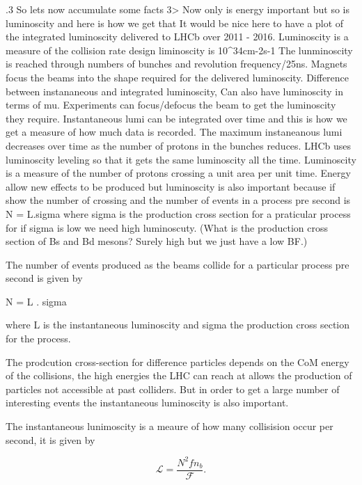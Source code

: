 .3
So lets now accumulate some facts 
3> Now only is energy important but so is luminoscity and here is how we get that
It would be nice here to have a plot of the integrated luminoscity delivered to LHCb over 2011 - 2016.
Luminoscity is a measure of the collision rate
design liminoscity is 10^34cm-2s-1
The lunminoscity is reached through numbers of bunches and revolution frequency/25ns.
Magnets focus the beams into the shape required for the delivered luminoscity.
Difference between instananeous and integrated luminoscity,
Can also have luminoscity in terms of mu.
Experiments can focus/defocus the beam to get the luminoscity they require.
Instantaneous lumi can be integrated over time and this is how we get a measure of how much data is recorded.
The maximum instaneanous lumi decreases over time as the number of protons in the bunches reduces. LHCb uses luminoscity leveling so that it gets the same luminoscity all the time.
Luminoscity is a measure of the number of protons crossing a unit area per unit time.
Energy allow new effects to be produced but luminoscity is also important because if show the number of crossing and the number of events in a process pre second is N = L.sigma where sigma is the production cross section for a praticular process for if sigma is low we need high luminoscuty. (What is the production cross section of Bs and Bd mesons? Surely high but we just have a low BF.)


The number of events produced as the beams collide for a particular process pre second is given by

N = L . sigma

where L is the instantaneous luminoscity and sigma the production cross section for the process. 

The prodcution cross-section for difference particles depends on the CoM energy of the collisions, the high energies the LHC can reach at allows the production of particles not accessible at past colliders. 
But in order to get a large number of interesting events the instantaneous luminoscity is also important. 

The instantaneous lunimoscity is a meaure of how many collisision occur per second, it is given by

\begin{equation}
\mathcal{L} = \frac{N^{2} f n_{b}}{\mathcal{F}}.
\label{eq:inst_lumi}
\end{equation}

